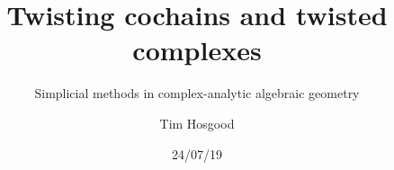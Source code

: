 \documentclass{beamer}
\title{Twisting cochains and twisted complexes}
\subtitle{Simplicial methods in complex-analytic algebraic geometry}
\author{Tim Hosgood}
\institute{Université d'Aix-Marseille}
\date{24/07/19}
\begin{document}
    \begin{frame}
        \titlepage
    \end{frame}
\end{document}
